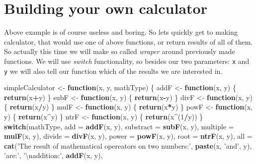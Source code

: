 \documentclass[]{book}
\newenvironment{Shaded}{\begin{snugshade}}{\end{snugshade}}
\newcommand{\KeywordTok}[1]{\textcolor[rgb]{0.13,0.29,0.53}{\textbf{#1}}}
\newcommand{\DataTypeTok}[1]{\textcolor[rgb]{0.13,0.29,0.53}{#1}}
\newcommand{\DecValTok}[1]{\textcolor[rgb]{0.00,0.00,0.81}{#1}}
\newcommand{\CharTok}[1]{\textcolor[rgb]{0.31,0.60,0.02}{#1}}
\newcommand{\StringTok}[1]{\textcolor[rgb]{0.31,0.60,0.02}{#1}}
\newcommand{\ControlFlowTok}[1]{\textcolor[rgb]{0.13,0.29,0.53}{\textbf{#1}}}
\newcommand{\OperatorTok}[1]{\textcolor[rgb]{0.81,0.36,0.00}{\textbf{#1}}}
\newcommand{\NormalTok}[1]{#1}
\theoremstyle{definition}
\theoremstyle{definition}
\theoremstyle{definition}
\theoremstyle{remark}
\begin{document}
\section{Building your own
calculator}\label{building-your-own-calculator}

Above example is of course useless and boring. So lets quickly get to
making calculator, that would use one of above functions, or return
results of all of them. So actually this time we will make so called
\emph{wraper} around previously made functions. We will use
\emph{switch} functionality, so besides our two parameters: \texttt{x}
and \texttt{y} we will also tell our function which of the results we
are interested in.

\begin{Shaded}
\begin{Highlighting}[]
\NormalTok{simpleCalculator <-}\StringTok{ }\ControlFlowTok{function}\NormalTok{(x, y, mathType) \{}
\NormalTok{  addF <-}\StringTok{ }\ControlFlowTok{function}\NormalTok{(x, y) \{}
  \KeywordTok{return}\NormalTok{(x}\OperatorTok{+}\NormalTok{y)}
\NormalTok{  \}}
\NormalTok{  subF <-}\StringTok{ }\ControlFlowTok{function}\NormalTok{(x, y) \{}
  \KeywordTok{return}\NormalTok{(x}\OperatorTok{-}\NormalTok{y)}
\NormalTok{  \}}
\NormalTok{  divF <-}\StringTok{ }\ControlFlowTok{function}\NormalTok{(x, y) \{}
  \KeywordTok{return}\NormalTok{(x}\OperatorTok{/}\NormalTok{y)}
\NormalTok{  \}}
\NormalTok{  mulF <-}\StringTok{ }\ControlFlowTok{function}\NormalTok{(x, y) \{}
  \KeywordTok{return}\NormalTok{(x}\OperatorTok{*}\NormalTok{y)}
\NormalTok{  \}}
\NormalTok{  powF <-}\StringTok{ }\ControlFlowTok{function}\NormalTok{(x, y) \{}
  \KeywordTok{return}\NormalTok{(x}\OperatorTok{^}\NormalTok{y)}
\NormalTok{  \}}
\NormalTok{  ntrF <-}\StringTok{ }\ControlFlowTok{function}\NormalTok{(x, y) \{}
  \KeywordTok{return}\NormalTok{(x}\OperatorTok{^}\NormalTok{(}\DecValTok{1}\OperatorTok{/}\NormalTok{y))}
\NormalTok{  \}}
  \ControlFlowTok{switch}\NormalTok{(mathType,}
         \DataTypeTok{add =} \KeywordTok{addF}\NormalTok{(x, y),}
         \DataTypeTok{substract =} \KeywordTok{subF}\NormalTok{(x, y),}
         \DataTypeTok{multiple =} \KeywordTok{mulF}\NormalTok{(x, y),}
         \DataTypeTok{divide =} \KeywordTok{divF}\NormalTok{(x, y),}
         \DataTypeTok{power =} \KeywordTok{powF}\NormalTok{(x, y),}
         \DataTypeTok{root =} \KeywordTok{ntrF}\NormalTok{(x, y),}
         \DataTypeTok{all =} \KeywordTok{cat}\NormalTok{(}\StringTok{'The result of mathematical opereators on two numbers:'}\NormalTok{,}
                      \KeywordTok{paste}\NormalTok{(x, }\StringTok{'and'}\NormalTok{, y), }\StringTok{'are:'}\NormalTok{, }\StringTok{'}\CharTok{\textbackslash{}n}\StringTok{addition:'}\NormalTok{, }\KeywordTok{addF}\NormalTok{(x, y),}

\end{Highlighting}
\end{Shaded}
\end{document}

